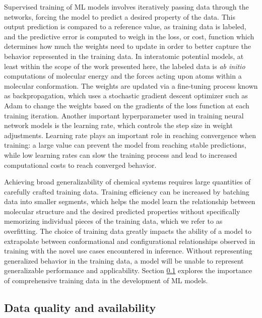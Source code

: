 Supervised training of ML models involves iteratively passing data through the networks, forcing the model to predict a desired property of the data.
This output prediction is compared to a reference value, as training data is labeled, and the predictive error is computed to weigh in the loss, or cost, function which determines how much the weights need to update in order to better capture the behavior represented in the training data. 
In interatomic potential models, at least within the scope of the work presented here, the labeled data is \textit{ab initio} computations of molecular energy and the forces acting upon atoms within a molecular conformation.
The weights are updated via a fine-tuning process known as backpropagation, which uses a stochastic gradient descent optimizer such as Adam \cite{adam_optim} to change the weights based on the gradients of the loss function at each training iteration. 
Another important hyperparameter used in training neural network models is the learning rate, which controls the step size in weight adjustments.
Learning rate plays an important role in reaching convergence when training: a large value can prevent the model from reaching stable predictions, while low learning rates can slow the training process and lead to increased computational costs to reach converged behavior.

Achieving broad generalizability of chemical systems requires large quantities of carefully crafted training data.
Training efficiency can be increased by batching data into smaller segments, which helps the model learn the relationship between molecular structure and the desired predicted properties without specifically memorizing individual pieces of the training data, which we refer to as overfitting.
The choice of training data greatly impacts the ability of a model to extrapolate between conformational and configurational relationships observed in training with the novel use cases encountered in inference. 
Without representing generalized behavior in the training data, a model will be unable to represent generalizable performance and applicability.
Section \ref{subsec:Data quality and availability} explores the importance of comprehensive training data in the development of ML models.

\subsection{Data quality and availability}
\label{subsec:Data quality and availability}

